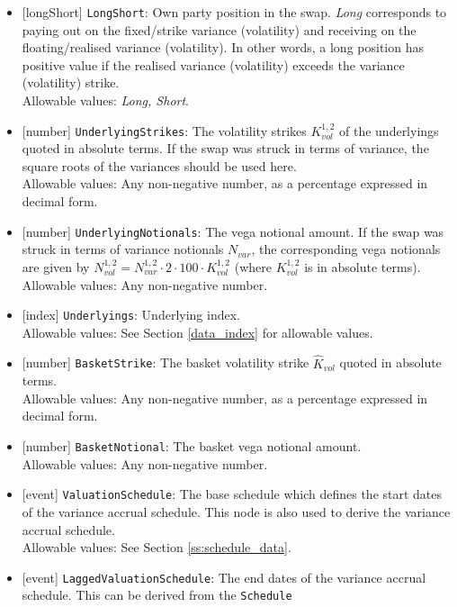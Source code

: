 \begin{itemize}
  \item{}[longShort] \lstinline!LongShort!: Own party position in the swap. \emph{Long} corresponds to paying out on the
  fixed/strike variance (volatility) and receiving on the floating/realised variance (volatility). In other words,
  a long position has positive value if the realised variance (volatility) exceeds the variance (volatility)
  strike. \\
  Allowable values: \emph{Long, Short}.
  \item{}[number] \lstinline!UnderlyingStrikes!: The volatility strikes $K^{1,2}_{vol}$ of the underlyings quoted in
  absolute terms. If the swap was struck in terms of variance, the square roots of the variances should be used here. \\
  Allowable values: Any non-negative number, as a percentage expressed in decimal form.
  \item{}[number] \lstinline!UnderlyingNotionals!: The vega notional amount. If the swap was struck in terms of variance notionals
  $N_{var}$, the corresponding vega notionals are given by $N^{1,2}_{vol} = N^{1,2}_{var} \cdot 2 \cdot 100 \cdot K^{1,2}_{vol}$
  (where $K^{1,2}_{vol}$ is in absolute terms). \\
  Allowable values: Any non-negative number.
  \item{}[index] \lstinline!Underlyings!: Underlying index. \\
  Allowable values: See Section \ref{data_index} for allowable values. 
  \item{}[number] \lstinline!BasketStrike!: The basket volatility strike $\hat{K}_{vol}$ quoted in absolute terms. \\
  Allowable values: Any non-negative number, as a percentage expressed in decimal form.
  \item{}[number] \lstinline!BasketNotional!: The basket vega notional amount. \\
  Allowable values: Any non-negative number.
  \item{}[event] \lstinline!ValuationSchedule!: The base schedule which defines the start dates of the variance accrual schedule. This node is
  also used to derive the variance accrual schedule. \\
  Allowable values: See Section \ref{ss:schedule_data}.
  \item{}[event] \lstinline!LaggedValuationSchedule!: The end dates of the variance accrual schedule. This can be derived from the \lstinline!Schedule!

\end{itemize}
